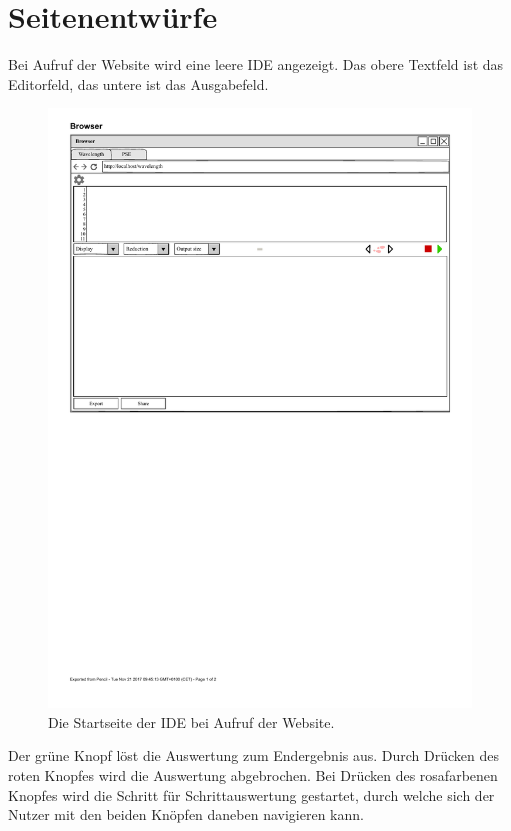 \documentclass[parskip=full,11pt,twoside]{scrartcl}
\begin{document}
\pagebreak
\appendix

\section{Seitenentwürfe}

Bei Aufruf der Website wird eine leere IDE angezeigt. Das obere Textfeld ist das Editorfeld, das untere ist das Ausgabefeld.

\begin{figure}[H]
	\centering
	\includegraphics[width = \textwidth]{img/startseite}
	\caption{Die Startseite der IDE bei Aufruf der Website.} 
\end{figure}


Der grüne Knopf löst die Auswertung zum Endergebnis aus. Durch Drücken des roten Knopfes wird die Auswertung abgebrochen. Bei Drücken des rosafarbenen Knopfes wird die Schritt für Schrittauswertung gestartet, durch welche sich der Nutzer mit den beiden Knöpfen daneben navigieren kann.
\end{document}
